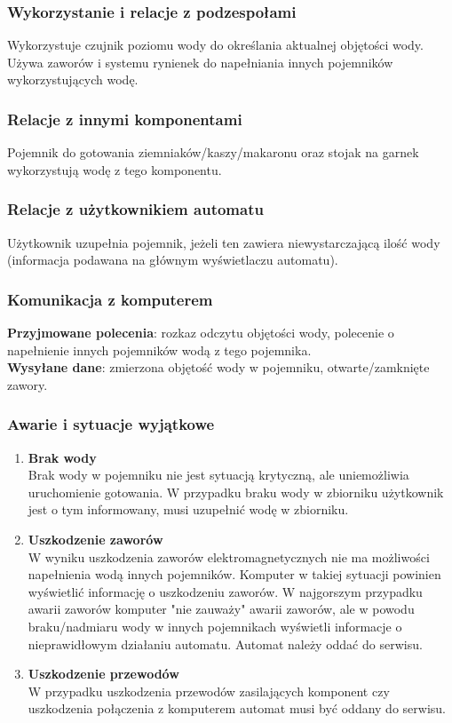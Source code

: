 \documentclass[12pt,a4paper,notitlepage]{article}
\begin{document}
\subsubsection{Wykorzystanie i relacje z podzespołami}
Wykorzystuje czujnik poziomu wody do określania aktualnej objętości wody. Używa zaworów i systemu rynienek do napełniania innych pojemników wykorzystujących wodę. 

\subsubsection{Relacje z innymi komponentami}
Pojemnik do gotowania ziemniaków/kaszy/makaronu oraz stojak na garnek wykorzystują wodę z tego komponentu.

\subsubsection{Relacje z użytkownikiem automatu}
Użytkownik uzupełnia pojemnik, jeżeli ten zawiera niewystarczającą ilość wody (informacja podawana na głównym wyświetlaczu automatu).

\subsubsection{Komunikacja z komputerem}
\textbf{Przyjmowane polecenia}: rozkaz odczytu objętości wody, polecenie o napełnienie innych pojemników wodą z tego pojemnika.\\
\textbf{Wysyłane dane}: zmierzona objętość wody w pojemniku, otwarte/zamknięte zawory.

\subsubsection{Awarie i sytuacje wyjątkowe}
\begin{enumerate}
  \item \textbf{Brak wody}\\
Brak wody w pojemniku nie jest sytuacją krytyczną, ale uniemożliwia uruchomienie gotowania. W przypadku braku wody w zbiorniku użytkownik jest o tym informowany, musi uzupełnić wodę w zbiorniku.
  \item \textbf{Uszkodzenie zaworów}\\
W wyniku uszkodzenia zaworów elektromagnetycznych nie ma możliwości napełnienia wodą innych pojemników. Komputer w takiej sytuacji powinien wyświetlić informację o uszkodzeniu zaworów. W najgorszym przypadku awarii zaworów komputer "nie zauważy" awarii zaworów, ale w powodu braku/nadmiaru wody w innych pojemnikach wyświetli informacje o nieprawidłowym działaniu automatu. Automat należy oddać do serwisu.
  \item \textbf{Uszkodzenie przewodów}\\
W przypadku uszkodzenia przewodów zasilających komponent czy uszkodzenia połączenia z komputerem automat musi być oddany do serwisu.
\end{enumerate}
\end{document}
